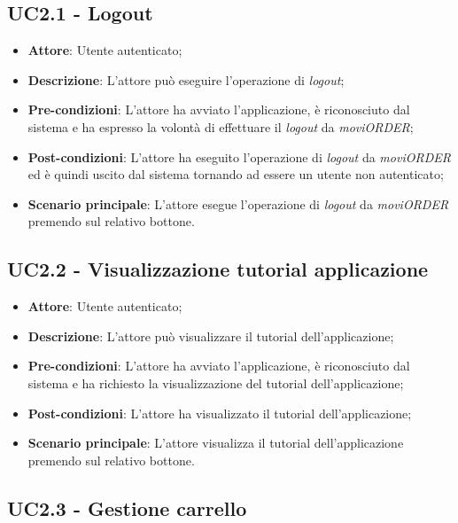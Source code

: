 \subsection{UC2.1 - Logout}

\begin{itemize}
	\item \textbf{Attore}: Utente autenticato;
	\item \textbf{Descrizione}: L'attore può eseguire l'operazione di \textit{logout};
	\item \textbf{Pre-condizioni}: L'attore ha avviato l'applicazione, è riconosciuto dal sistema e ha espresso la volontà di effettuare il \textit{logout} da \textit{moviORDER};
	\item \textbf{Post-condizioni}: L'attore ha eseguito l'operazione di \textit{logout} da \textit{moviORDER} ed è quindi uscito dal sistema tornando ad essere un utente non autenticato;
	\item \textbf{Scenario principale}: L'attore esegue l'operazione di \textit{logout} da \textit{moviORDER} premendo sul relativo bottone.
\end{itemize}

\subsection{UC2.2 - Visualizzazione tutorial applicazione}

\begin{itemize}
	\item \textbf{Attore}: Utente autenticato;
	\item \textbf{Descrizione}: L'attore può visualizzare il tutorial dell'applicazione;
	\item \textbf{Pre-condizioni}: L'attore ha avviato l'applicazione, è riconosciuto dal sistema e ha richiesto la visualizzazione del tutorial dell'applicazione;
	\item \textbf{Post-condizioni}: L'attore ha visualizzato il tutorial dell'applicazione;
	\item \textbf{Scenario principale}: L'attore visualizza il tutorial dell'applicazione premendo sul relativo bottone.
\end{itemize}

\newpage

\subsection{UC2.3 - Gestione carrello}

